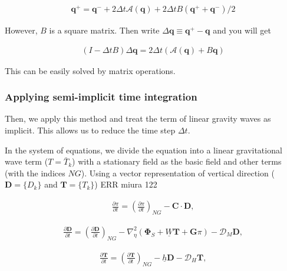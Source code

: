 \begin{eqnarray}
  {\mathbf q}^+ 
      = {\mathbf q}^- 
      + 2 \Delta t {\mathcal A}( {\mathbf q}  )
      + 2 \Delta t B (   {\mathbf q}^+ 
                       + {\mathbf q}^-   )/2
\end{eqnarray}

However, \(B\) is a square matrix. Then write
\(\Delta {\mathbf q} \equiv {\mathbf q}^+ - {\mathbf q}\) and you will
get

\begin{eqnarray}
  ( I - \Delta t B ) \Delta {\mathbf q} 
      = 2 \Delta t \left( {\mathcal A}({\mathbf q})
                         + B {\mathbf q} \right) 
\end{eqnarray}

This can be easily solved by matrix operations.

\hypertarget{applying-semi-implicit-time-integration}{%
\subsubsection{Applying semi-implicit time
integration}\label{applying-semi-implicit-time-integration}}

Then, we apply this method and treat the term of linear gravity waves as
implicit. This allows us to reduce the time step \(\Delta t\).

In the system of equations, we divide the equation into a linear
gravitational wave term (\(T=\bar{T}_k\)) with a stationary field as the
basic field and other terms (with the indices \(NG\)). Using a vector
representation of vertical direction (\({\mathbf{D}}=\{ D_{k} \}\) and
\({\mathbf{T}}=\{ T_{k} \}\)) ERR miura 122

\begin{eqnarray}
   \frac{\partial \pi}{\partial t} = 
          \left( \frac{\partial \pi}{\partial t} \right)_{NG}  
     - {\mathbf{C}} \cdot {\mathbf{D}},
\end{eqnarray}

\begin{eqnarray}
  \frac{\partial {\mathbf{D}}}{\partial t} = 
          \left( \frac{\partial {\mathbf{D}}}{\partial t} \right)_{NG}  
          - \nabla^{2}_{\eta} ( {\mathbf{\Phi}}_{S} 
                                  + \underline{W} {\mathbf{T}}
                                  + {\mathbf{G}} \pi )  
          - {\mathcal D}_M {\mathbf{D}} ,
\end{eqnarray}

\begin{eqnarray}
  \frac{\partial {\mathbf{T}}}{\partial t} 
      =   \left( \frac{\partial {\mathbf{T}}}
                        {\partial t}       \right)_{NG}  
         - \underline{h} {\mathbf{D}}
         - {\mathcal D}_H {\mathbf{T}} ,
\end{eqnarray}

